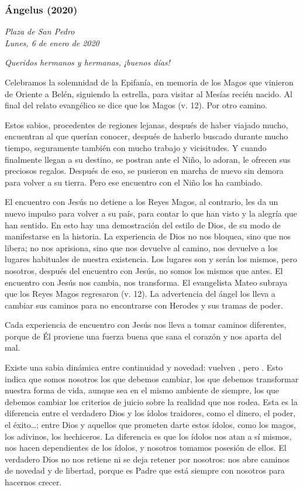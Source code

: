 \begin{body}
\begin{body}
{\subsubsection{Ángelus (2020)}

\emph{Plaza de San Pedro\\ Lunes, 6 de enero de 2020}



\emph{Queridos hermanos y hermanas, ¡buenos días!}

Celebramos la solemnidad de la Epifanía, en memoria de los Magos que vinieron de Oriente a Belén, siguiendo la estrella, para visitar al Mesías recién nacido. Al final del relato evangélico se dice que los Magos  (v. 12). Por otro camino.

Estos sabios, procedentes de regiones lejanas, después de haber viajado mucho, encuentran al que querían conocer, después de haberlo buscado durante mucho tiempo, seguramente también con mucho trabajo y vicisitudes. Y cuando finalmente llegan a su destino, se postran ante el Niño, lo adoran, le ofrecen sus preciosos regalos. Después de eso, se pusieron en marcha de nuevo sin demora para volver a su tierra. Pero ese encuentro con el Niño los ha cambiado.

El encuentro con Jesús no detiene a los Reyes Magos, al contrario, les da un nuevo impulso para volver a su país, para contar lo que han visto y la alegría que han sentido. En esto hay una demostración del estilo de Dios, de su modo de manifestarse en la historia. La experiencia de Dios no nos bloquea, sino que nos libera; no nos aprisiona, sino que nos devuelve al camino, nos devuelve a los lugares habituales de nuestra existencia. Los lugares son y serán los mismos, pero nosotros, después del encuentro con Jesús, no somos los mismos que antes. El encuentro con Jesús nos cambia, nos transforma. El evangelista Mateo subraya que los Reyes Magos regresaron  (v. 12). La advertencia del ángel los lleva a cambiar sus caminos para no encontrarse con Herodes y sus tramas de poder.

Cada experiencia de encuentro con Jesús nos lleva a tomar caminos diferentes, porque de Él proviene una fuerza buena que sana el corazón y nos aparta del mal.

Existe una sabia dinámica entre continuidad y novedad: vuelven , pero . Esto indica que somos nosotros los que debemos cambiar, los que debemos transformar nuestra forma de vida, aunque sea en el mismo ambiente de siempre, los que debemos cambiar los criterios de juicio sobre la realidad que nos rodea. Esta es la diferencia entre el verdadero Dios y los ídolos traidores, como el dinero, el poder, el éxito\ldots{}; entre Dios y aquellos que prometen darte estos ídolos, como los magos, los adivinos, los hechiceros. La diferencia es que los ídolos nos atan a sí mismos, nos hacen dependientes de los ídolos, y nosotros tomamos posesión de ellos. El verdadero Dios no nos retiene ni se deja retener por nosotros: nos abre caminos de novedad y de libertad, porque es Padre que está siempre con nosotros para hacernos crecer.

}
\end{body}
\end{body}
